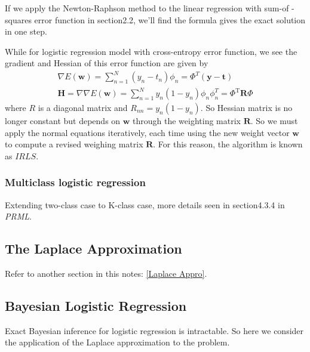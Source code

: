 \documentclass[a4paper]{book}
\newcommand{\mrm}{\mathrm}
\newcommand{\mbf}{\mathbf}
\newcommand{\RR}{\mbf R}
\newcommand{\ww}{\mbf w}
\newcommand{\ttt}{\mbf t}
\newcommand{\yy}{\mbf y}
\newcommand{\trans}{^{\mrm T}}
\begin{document}
If we apply the Newton-Raphson method  to the linear regression with sum-of -squares error function in section2.2, we'll find the formula gives the exact solution in one step.

While for logistic regression model with cross-entropy error function, we see the gradient and Hessian of this error function are given by
\begin{gather}\label{}
  \nabla E(\ww) = \sum_{n=1}^N(y_n-t_n)\phi_n = \Phi^T(\yy-\ttt) \\
  \mbf H=\nabla\nabla E(\ww) = \sum_{n=1}^Ny_n(1-y_n)\phi_n\phi_n^T = \Phi\trans \mbf R\Phi
\end{gather}
where $R$ is a diagonal matrix and $R_{nn} = y_n(1-y_n)$. So Hessian matrix is no longer constant but depends on $\ww$ through the weighting matrix $\RR$. So we must apply the normal equations iteratively, each time using the new weight vector $\ww$ to compute a revised weighing matrix $\RR$. For this reason, the algorithm is known as $IRLS$.
\subsubsection*{Multiclass logistic regression}
Extending two-class case to K-class case, more  details seen in section4.3.4 in \textit{PRML}.

\subsection{The Laplace Approximation}
Refer to another section in this notes: \ref{Laplace Appro}.

\subsection{Bayesian Logistic Regression}
Exact Bayesian inference for logistic regression is intractable. So here we consider the application of the Laplace approximation to the problem.
\end{document}
